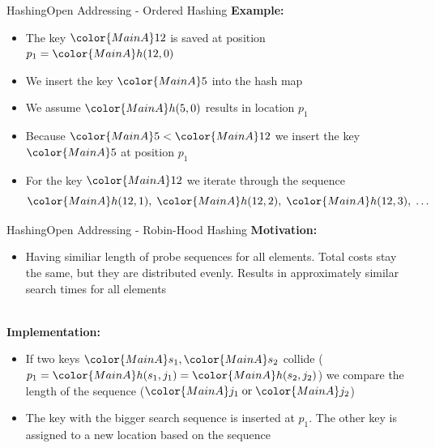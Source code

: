 
\begin{frame}{Hashing}{Open Addressing - Ordered Hashing}
  \textbf{Example:}
  \begin{itemize}
    \item
      The key ${\color{MainA}12}$ is saved at position
      $p_1 = {\color{MainA}h(12, 0)}$
    \item
      We insert the key ${\color{MainA}5}$ into the hash map
    \item
      We assume ${\color{MainA}h(5,0)}$ results in location $p_1$
    \item
      Because ${\color{MainA}5} < {\color{MainA}12}$ we insert
      the key ${\color{MainA}5}$ at position $p_1$
    \item
      For the key ${\color{MainA}12}$ we iterate through the sequence
      \begin{displaymath}
        {\color{MainA}h(12, 1)} ,\;
        {\color{MainA}h(12, 2)} ,\;
        {\color{MainA}h(12, 3)} ,\;
        \dots
      \end{displaymath}
  \end{itemize}
\end{frame}


\begin{frame}{Hashing}{Open Addressing - Robin-Hood Hashing}
  \textbf{Motivation:}
  \begin{itemize}
    \item <2->
      Having similiar length of probe sequences for all elements.
      Total costs stay the same, but they are distributed evenly.
      Results in approximately similar search times for all elements
  \end{itemize}
  \hfill\\[0.5em]
  \textbf{Implementation:}
  \begin{itemize}
    \item<4->
      If two keys ${\color{MainA}s_1}, {\color{MainA}s_2}$ collide
      (\begin{math}
        p_1 = {\color{MainA}h(s_1, j_1)}
            = {\color{MainA}h(s_2, j_2)}
      \end{math})
      we compare the length of the sequence
      (\begin{math}
        {\color{MainA}j_1} \;\text{or}\; {\color{MainA}j_2}
      \end{math})
    \item<5->
      The key with the bigger search sequence is inserted at $p_1$.
      The other key is assigned to a new location based on the sequence
  \end{itemize}
\end{frame}


